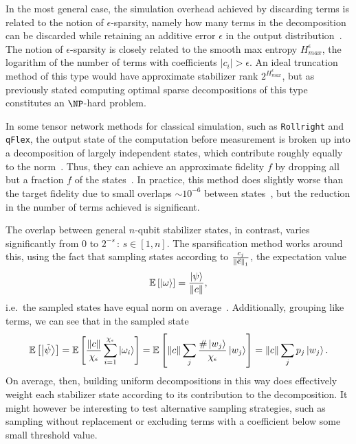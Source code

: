 In the most general case, the simulation overhead achieved by discarding terms is related to the notion of $\epsilon$-sparsity, namely how many terms in the decomposition can be discarded while retaining an additive error $\epsilon$ in the output distribution~\cite{Pashayan2017}. The notion of $\epsilon$-sparsity is closely related to the smooth max entropy $H_{max}^{\epsilon}$, the logarithm of the number of terms with coefficients $\left|c_{i}\right|>\epsilon$. An ideal truncation method of this type would have approximate stabilizer rank $2^{H_{max}^{\epsilon}}$, but as previously stated computing optimal sparse decompositions of this type constitutes an $\NP$-hard problem.\par
In some tensor network methods for classical simulation, such as \texttt{Rollright} and \texttt{qFlex}, the output state of the computation before measurement is broken up into a decomposition of largely independent states, which contribute roughly equally to the norm~\cite{Markov2018,Villalonga2018}. Thus, they can achieve an approximate fidelity $f$ by dropping all but a fraction $f$ of the states~\cite{Markov2018}. In practice, this method does slightly worse than the target fidelity due to small overlaps $\sim10^{-6}$ between states~\cite{Villalonga2018}, but the reduction in the number of terms achieved is significant.\par
The overlap between general $n$-qubit stabilizer states, in contrast, varies significantly from $0$ to $2^{-s}\,:\,s\in\left[1,n\right]$. The sparsification method works around this, using the fact that sampling states according to $\frac{c_{j}}{\norm{\va{c}}_{1}}$, the expectation value 
\[\mathbb{E}\left[\ket{\omega}\right]=\frac{\ket{\psi}}{\norm{c}},\]
i.e.\ the sampled states have equal norm on average~\cite{Bravyi2018}. Additionally, grouping like terms, we can see that in the sampled state
\[\mathbb{E}\left[\ket{\tilde{\psi}}\right]=\mathbb{E}\left[\frac{\norm{c}}{\chi_{\epsilon}}\sum_{i=1}^{\chi_{\epsilon}}\ket{\omega_{i}}\right] = \mathbb{E}\left[\norm{c}
\sum_{j}\frac{\#\ket{w_{j}}}{\chi_{\epsilon}}\ket{w_{j}}\right]=\norm{c}\sum_{j}p_{j}\ket{w_{j}}.\]
On average, then, building uniform decompositions in this way does effectively weight each stabilizer state according to its contribution to the decomposition. It might however be interesting to test alternative sampling strategies, such as sampling without replacement or excluding terms with a coefficient below some small threshold value.